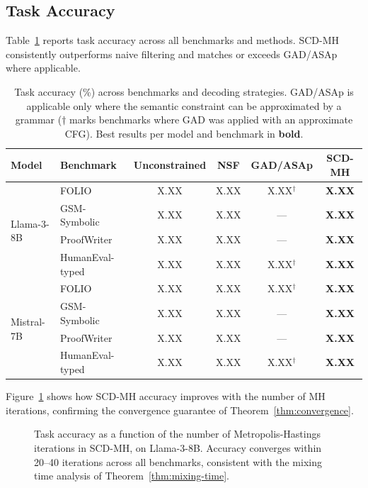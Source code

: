 \documentclass[twoside,11pt]{article}
\begin{document}
\subsection{Task Accuracy}
\label{sec:exp-accuracy}

Table~\ref{tab:accuracy} reports task accuracy across all benchmarks and
methods. SCD-MH consistently outperforms naive filtering and matches or
exceeds GAD/ASAp where applicable.

\begin{table}[t]
\caption{Task accuracy (\%) across benchmarks and decoding strategies.
GAD/ASAp is applicable only where the semantic constraint can be
approximated by a grammar ($\dagger$ marks benchmarks where GAD was applied
with an approximate CFG). Best results per model and benchmark in
\textbf{bold}.}
\label{tab:accuracy}
\centering
\begin{tabular}{llcccc}
\toprule
\textbf{Model} & \textbf{Benchmark} & \textbf{Unconstrained} &
\textbf{NSF} & \textbf{GAD/ASAp} & \textbf{SCD-MH} \\
\midrule
\multirow{4}{*}{Llama-3-8B}
 & FOLIO            & X.XX & X.XX & X.XX$^\dagger$ & \textbf{X.XX} \\
 & GSM-Symbolic     & X.XX & X.XX & ---           & \textbf{X.XX} \\
 & ProofWriter      & X.XX & X.XX & ---           & \textbf{X.XX} \\
 & HumanEval-typed  & X.XX & X.XX & X.XX$^\dagger$ & \textbf{X.XX} \\
\midrule
\multirow{4}{*}{Mistral-7B}
 & FOLIO            & X.XX & X.XX & X.XX$^\dagger$ & \textbf{X.XX} \\
 & GSM-Symbolic     & X.XX & X.XX & ---           & \textbf{X.XX} \\
 & ProofWriter      & X.XX & X.XX & ---           & \textbf{X.XX} \\
 & HumanEval-typed  & X.XX & X.XX & X.XX$^\dagger$ & \textbf{X.XX} \\
\bottomrule
\end{tabular}
\end{table}

Figure~\ref{fig:convergence-accuracy} shows how SCD-MH accuracy improves
with the number of MH iterations, confirming the convergence guarantee of
Theorem~\ref{thm:convergence}.

\begin{figure}[t]
\centering
\caption{Task accuracy as a function of the number of Metropolis-Hastings
iterations in SCD-MH, on Llama-3-8B. Accuracy converges within 20--40
iterations across all benchmarks, consistent with the mixing time analysis
of Theorem~\ref{thm:mixing-time}.}
\label{fig:convergence-accuracy}
\end{figure}
\end{document}
